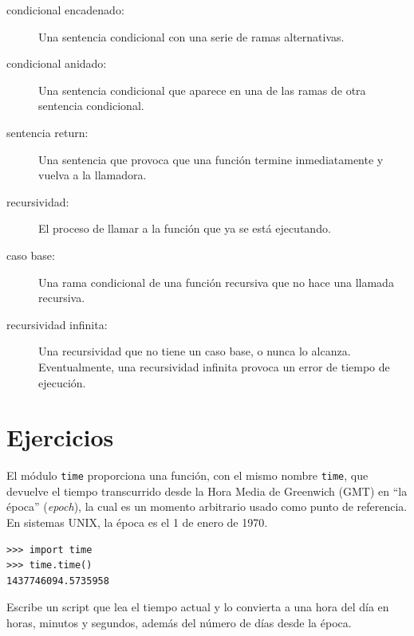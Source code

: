 \documentclass[10pt]{book}
\begin{document}
\begin{description}
\item[condicional encadenado:]  Una sentencia condicional con una serie
de ramas alternativas.

\item[condicional anidado:]  Una sentencia condicional que aparece
en una de las ramas de otra sentencia condicional.

\item[sentencia return:] Una sentencia que provoca que una función
termine inmediatamente y vuelva a la llamadora.

\item[recursividad:]  El proceso de llamar a la función que ya se está
ejecutando.

\item[caso base:]  Una rama condicional de una
función recursiva que no hace una llamada recursiva.

\item[recursividad infinita:]  Una recursividad que no tiene un
caso base, o nunca lo alcanza.  Eventualmente, una recursividad infinita
provoca un error de tiempo de ejecución.

\end{description}

\section{Ejercicios}

\begin{exercise}

El módulo {\tt time} proporciona una función, con el mismo nombre {\tt time}, que
devuelve el tiempo transcurrido desde la Hora Media de Greenwich (GMT) en ``la época'' ({\em epoch}), la cual es
un momento arbitrario usado como punto de referencia.  En sistemas UNIX, la
época es el 1 de enero de 1970.

\begin{verbatim}
>>> import time
>>> time.time()
1437746094.5735958
\end{verbatim}

Escribe un script que lea el tiempo actual y lo convierta a
una hora del día en horas, minutos y segundos, además del número de
días desde la época.

\end{exercise}
\end{document}
